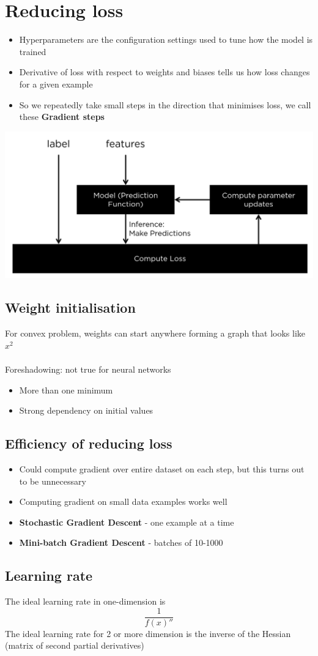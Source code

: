 \documentclass{article}[18pt]
\begin{document}
\section{Reducing loss}
\begin{itemize}
	\item Hyperparameters are the configuration settings used to tune how the model is trained
	\item Derivative of loss with respect to weights and biases tells us how loss changes for a given example
	\item So we repeatedly take small steps in the direction that minimises loss, we call these \textbf{Gradient steps}
\end{itemize}
\begin{center}
	\includegraphics[scale=0.5]{"Gradient Descent"}
\end{center}
\subsection{Weight initialisation}
For convex problem, weights can start anywhere forming a graph that looks like $x^2$\\
\\
Foreshadowing: not true for neural networks
\begin{itemize}
	\item More than one minimum
	\item Strong dependency on initial values
\end{itemize}
\subsection{Efficiency of reducing loss}
\begin{itemize}
	\item Could compute gradient over entire dataset on each step, but this turns out to be unnecessary
	\item Computing gradient on small data examples works well
	\item \textbf{Stochastic Gradient Descent} - one example at a time
	\item \textbf{Mini-batch Gradient Descent} - batches of 10-1000
\end{itemize}
\subsection{Learning rate}
The ideal learning rate in one-dimension is
$$\dfrac{1}{f(x)''}$$
The ideal learning rate for 2 or more dimension is the inverse of the Hessian (matrix of second partial derivatives)
\end{document}
